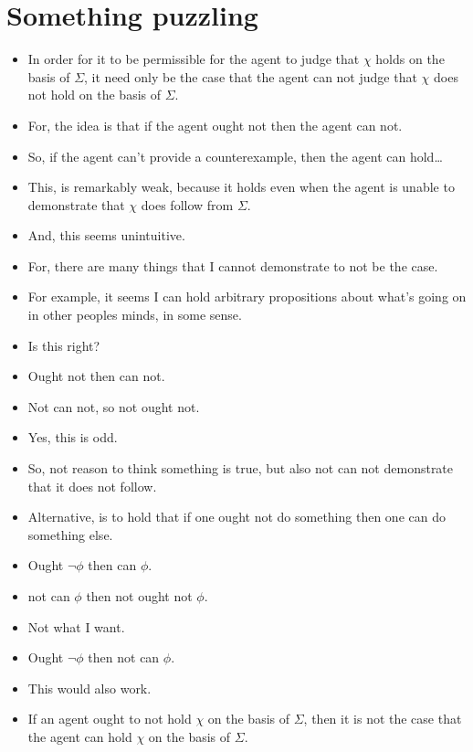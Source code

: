 \documentclass[10pt]{article}
\begin{document}
\newpage

\section{Something puzzling}
\label{sec:something-puzzling}

\begin{itemize}
\item In order for it to be permissible for the agent to judge that \(\chi\) holds on the basis of \(\Sigma\), it need only be the case that the agent can not judge that \(\chi\) does not hold on the basis of \(\Sigma\).
\item For, the idea is that if the agent ought not then the agent can not.
\item So, if the agent can't provide a counterexample, then the agent can hold\dots
\item This, is remarkably weak, because it holds even when the agent is unable to demonstrate that \(\chi\) does follow from \(\Sigma\).
\item And, this seems unintuitive.
\item For, there are many things that I cannot demonstrate to not be the case.
\item For example, it seems I can hold arbitrary propositions about what's going on in other peoples minds, in some sense.
\item Is this right?
\item Ought not then can not.
\item Not can not, so not ought not.
\item Yes, this is odd.
\item So, not reason to think something is true, but also not can not demonstrate that it does not follow.
\end{itemize}

\begin{itemize}
\item Alternative, is to hold that if one ought not do something then one can do something else.
\item Ought \(\lnot\phi\) then can \(\phi\).
\item not can \(\phi\) then not ought not \(\phi\).
\item Not what I want.
\item Ought \(\lnot\phi\) then not can \(\phi\).
\item This would also work.
\item If an agent ought to not hold \(\chi\) on the basis of \(\Sigma\), then it is not the case that the agent can hold \(\chi\) on the basis of \(\Sigma\).
\end{itemize}
\end{document}
